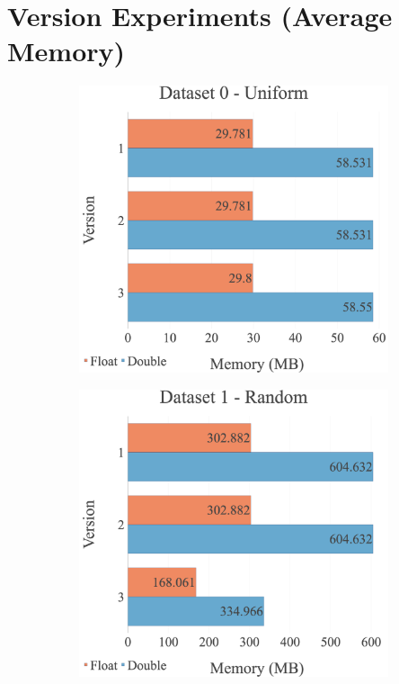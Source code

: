 \section{Version Experiments (Average Memory)}
\begin{figure}[H]
\begin{adjustwidth}{-2cm}{-2cm}
\centering
\begin{subfigure}{.62\textwidth}
    \centering
    \includegraphics[width=1\textwidth]{img/experiments/mem-multi-versions-0_UNIFORM.png}
\end{subfigure}
\begin{subfigure}{.62\textwidth}
    \centering
    \includegraphics[width=1\textwidth]{img/experiments/mem-multi-versions-1_RAND.png}

\end{subfigure}
\end{adjustwidth}
\end{figure}
